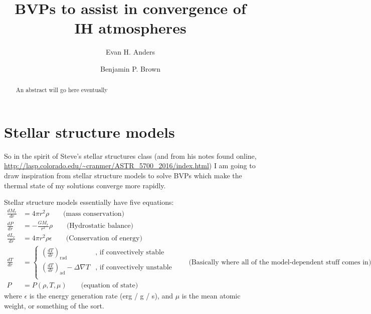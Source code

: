 \documentclass[aps, pre, onecolumn, nofootinbib, notitlepage, groupedaddress, amsfonts, amssymb, amsmath, longbibliography]{revtex4-1}
\newcommand{\grad}{\ensuremath{\nabla}}
\begin{document}
\author{Evan H. Anders}
\author{Benjamin P. Brown}
\title{BVPs to assist in convergence of IH atmospheres}

\begin{abstract}
An abstract will go here eventually
\end{abstract}
\maketitle


\section{Stellar structure models}
So in the spirit of Steve's stellar structures class (and from his notes found online,
\url{http://lasp.colorado.edu/~cranmer/ASTR_5700_2016/index.html}) I am going to
draw inspiration from stellar structure models to solve BVPs which make the thermal state of my
solutions converge more rapidly.

Stellar structure models essentially have five equations:
\begin{equation}
\begin{split}
\frac{d M_r}{dr} &= 4\pi r^2 \rho \qquad \text{(mass conservation)} \\
\frac{d P}{dr} &= -\frac{G M_r}{r^2}\rho \qquad \text{(Hydrostatic balance)} \\
\frac{d L_r}{dr} &= 4\pi r^2 \rho \epsilon \qquad \text{(Conservation of energy)} \\
\frac{d T}{dr} &= \begin{cases}
\left(\frac{dT}{dr}\right)_{\text{rad}} & \text{, if convectively stable}\\
\left(\frac{dT}{dr}\right)_{\text{ad}} - \Delta\grad T & \text{, if convectively unstable}\\
\end{cases} \qquad \text{(Basically where all of the model-dependent stuff comes in)} \\
P &= P(\rho, T, \mu)  \qquad \text{(equation of state)}
\end{split}
\end{equation}
where $\epsilon$ is the energy generation rate (erg / g / s), and $\mu$ is the
mean atomic weight, or something of the sort.
\end{document}
